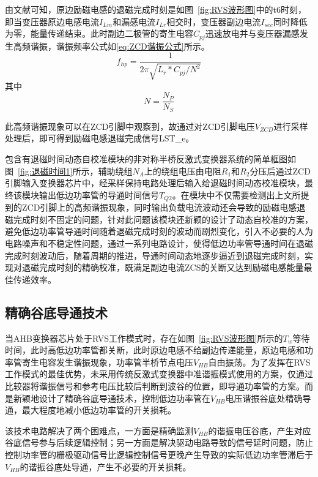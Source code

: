 由文献可知，原边励磁电感的退磁完成时刻是如图~\ref{fig:RVS波形图}中的t6时刻，即当变压器原边电感电流$I_{Lm}$和漏感电流$I_{Lr}$相交时，变压器副边电流$I_{sec}$同时降低为零，能量传递结束。此时副边二极管的寄生电容$C_{pj}$迅速放电并与变压器漏感发生高频谐振，谐振频率公式如\eqref{eq:ZCD谐振公式}所示。
\begin{equation}
    \label{eq:ZCD谐振公式}
    f_{hp} = \frac{1}{2\pi \sqrt{L_r * C_{pj}/N^2}}
\end{equation}
其中 
\begin{equation}
    \label{eq:变压器匝比}
    N=\frac{N_P}{N_S}
\end{equation}

此高频谐振现象可以在ZCD引脚中观察到，故通过对ZCD引脚电压$V_{ZCD}$进行采样处理后，即可得到励磁电感退磁完成信号LST\_e。

包含有退磁时间动态自校准模块的非对称半桥反激式变换器系统的简单框图如图~\ref{fig:退磁时间1}所示，辅助绕组$N_A$上的绕组电压由电阻$R_1$和$R_2$分压后通过ZCD引脚输入变换器芯片中，经采样保持电路处理后输入给退磁时间动态校准模块，最终该模块输出低边功率管的导通时间信号$T_{Q2}$。在模块中不仅需要检测出上文所提到的ZCD引脚上的高频谐振现象，同时输出负载电流波动还会导致的励磁电感退磁完成时刻不固定的问题，针对此问题该模块还新颖的设计了动态自校准的方案，避免低边功率管导通时间随着退磁完成时刻的波动而剧烈变化，引入不必要的人为电路噪声和不稳定性问题，通过一系列电路设计，使得低边功率管导通时间在退磁完成时刻波动后，随着周期的推进，导通时间动态地逐步逼近到退磁完成时刻，实现对退磁完成时刻的精确校准，既满足副边电流ZCS的关断又达到励磁电感能量最佳传递效率。




\subsection{精确谷底导通技术}
当AHB变换器芯片处于RVS工作模式时，存在如图~\ref{fig:RVS波形图}所示的$T_w$等待时间，此时高低边功率管都关断，此时原边电感不给副边传递能量，原边电感和功率管寄生电容发生谐振现象，功率管半桥节点电压$V_{HB}$自由振荡。为了发挥在RVS工作模式的最佳优势，未采用传统反激式变换器中准谐振模式使用的方案，仅通过比较器将谐振信号和参考电压比较后判断到波谷的位置，即导通功率管的方案。而是新颖地设计了精确谷底导通技术，控制低边功率管在$V_{HB}$电压谐振谷底处精确导通，最大程度地减小低边功率管的开关损耗。

该技术电路解决了两个困难点，一方面是精确监测$V_{HB}$的谐振电压谷底，产生对应谷底信号参与后续逻辑控制；另一方面是解决驱动电路导致的信号延时问题，防止控制功率管的栅极驱动信号比逻辑控制信号更晚产生导致的实际低边功率管滞后于$V_{HB}$的谐振谷底处导通，产生不必要的开关损耗。

